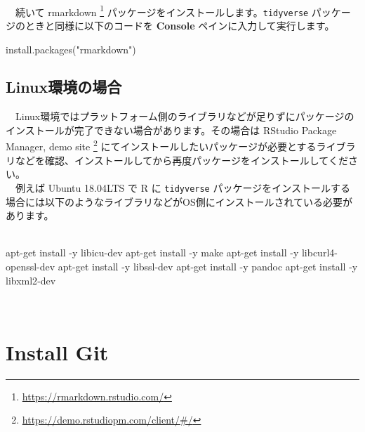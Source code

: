 \documentclass[
  12pt,
]{book}
\newenvironment{Shaded}{\begin{snugshade}}{\end{snugshade}}
\newcommand{\AttributeTok}[1]{\textcolor[rgb]{0.77,0.63,0.00}{#1}}
\newcommand{\ExtensionTok}[1]{#1}
\newcommand{\FunctionTok}[1]{\textcolor[rgb]{0.00,0.00,0.00}{#1}}
\newcommand{\NormalTok}[1]{#1}
\newcommand{\StringTok}[1]{\textcolor[rgb]{0.31,0.60,0.02}{#1}}
\DeclareRobustCommand{\href}[2]{#2\footnote{\url{#1}}}
\begin{document}
　

　続いて \href{https://rmarkdown.rstudio.com/}{rmarkdown } パッケージをインストールします。\texttt{tidyverse} パッケージのときと同様に以下のコードを \textbf{Console} ペインに入力して実行します。

\begin{Shaded}
\begin{Highlighting}[]
\FunctionTok{install.packages}\NormalTok{(}\StringTok{"rmarkdown"}\NormalTok{)}
\end{Highlighting}
\end{Shaded}

\hypertarget{linuxux74b0ux5883ux306eux5834ux5408}{%
\subsection{Linux環境の場合}\label{linuxux74b0ux5883ux306eux5834ux5408}}

　Linux環境ではプラットフォーム側のライブラリなどが足りずにパッケージのインストールが完了できない場合があります。その場合は \href{https://demo.rstudiopm.com/client/\#/}{RStudio Package Manager, demo site } にてインストールしたいパッケージが必要とするライブラリなどを確認、インストールしてから再度パッケージをインストールしてください。\\
　例えば Ubuntu 18.04LTS で R に \texttt{tidyverse} パッケージをインストールする場合には以下のようなライブラリなどがOS側にインストールされている必要があります。\\
　

\begin{Shaded}
\begin{Highlighting}[]
\ExtensionTok{apt{-}get}\NormalTok{ install }\AttributeTok{{-}y}\NormalTok{ libicu{-}dev}
\ExtensionTok{apt{-}get}\NormalTok{ install }\AttributeTok{{-}y}\NormalTok{ make}
\ExtensionTok{apt{-}get}\NormalTok{ install }\AttributeTok{{-}y}\NormalTok{ libcurl4{-}openssl{-}dev}
\ExtensionTok{apt{-}get}\NormalTok{ install }\AttributeTok{{-}y}\NormalTok{ libssl{-}dev}
\ExtensionTok{apt{-}get}\NormalTok{ install }\AttributeTok{{-}y}\NormalTok{ pandoc}
\ExtensionTok{apt{-}get}\NormalTok{ install }\AttributeTok{{-}y}\NormalTok{ libxml2{-}dev}
\end{Highlighting}
\end{Shaded}

　

\hypertarget{install-git}{%
\section{Install Git}\label{install-git}}
\end{document}
